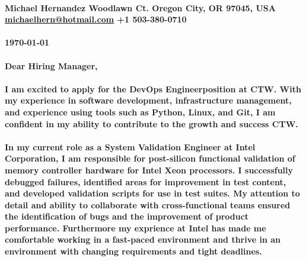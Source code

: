 \documentclass[a4paper,12pt]{article}
\def\applicationCompany{CTW}
\def\jobName{DevOps Engineer}
\begin{document}
	
	\paragraph{\linebreak}
	\paragraph{Michael Hernandez  Woodlawn Ct. \linebreak
		Oregon City, OR 97045, USA \linebreak
		\href{mailto:michaelhern@hotmail.com}{\underline{michaelhern@hotmail.com}} \linebreak
		+1 503-380-0710\linebreak} 
	
	\paragraph{\linebreak\today}
	
	\paragraph{Dear Hiring Manager,}
	
	
	\paragraph{I am excited to apply for the \jobName \space position at \applicationCompany. With my experience in software development, infrastructure management, and experience using tools such as Python, Linux, and Git, I am confident in my ability to contribute to the growth and success \applicationCompany.}
	
	\paragraph{In my current role as a System Validation Engineer at Intel Corporation, I am responsible for post-silicon functional validation of memory controller hardware for Intel Xeon processors.  I successfully debugged failures, identified areas for improvement in test content, and developed validation scripts for use in test suites.  My attention to detail and ability to collaborate with cross-functional teams ensured the identification of bugs and the improvement of product performance.  Furthermore my exprience at Intel has made me comfortable working in a fast-paced environment and thrive in an environment with changing requirements and tight deadlines.}
	
\end{document}
